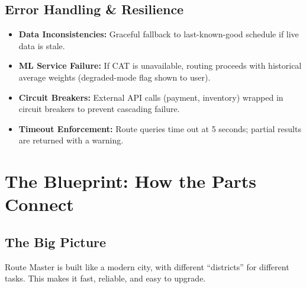 \documentclass[12pt,a4paper]{report}
\begin{document}
\section{Error Handling \& Resilience}

\begin{itemize}[leftmargin=1.5em]
  \item \textbf{Data Inconsistencies:} Graceful fallback to last-known-good schedule if live data is stale.
  \item \textbf{ML Service Failure:} If CAT is unavailable, routing proceeds with historical average weights (degraded-mode flag shown to user).
  \item \textbf{Circuit Breakers:} External API calls (payment, inventory) wrapped in circuit breakers to prevent cascading failure.
  \item \textbf{Timeout Enforcement:} Route queries time out at 5 seconds; partial results are returned with a warning.
\end{itemize}

\chapter{The Blueprint: How the Parts Connect}

\section{The Big Picture}

Route Master is built like a modern city, with different ``districts'' for different tasks. This makes it fast, reliable, and easy to upgrade.
\end{document}
